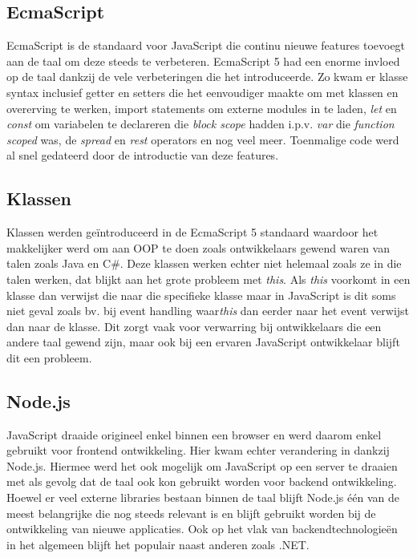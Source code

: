 \subsection{EcmaScript}
EcmaScript is de standaard voor JavaScript die continu nieuwe features toevoegt aan de taal om deze steeds te verbeteren. EcmaScript 5 had een enorme invloed op de taal dankzij de vele verbeteringen die het introduceerde. Zo kwam er klasse syntax inclusief getter en setters die het eenvoudiger maakte om met klassen en overerving te werken, import statements om externe modules in te laden, \textit{let} en \textit{const} om variabelen te declareren die \textit{block scope} hadden i.p.v. \textit{var} die \textit{function scoped} was, de \textit{spread} en \textit{rest} operators en nog veel meer. Toenmalige code werd al snel gedateerd door de introductie van deze features.

\subsection{Klassen}
Klassen werden geïntroduceerd in de EcmaScript 5 standaard waardoor het makkelijker werd om aan OOP te doen zoals ontwikkelaars gewend waren van talen zoals Java en C\#. Deze klassen werken echter niet helemaal zoals ze in die talen werken, dat blijkt aan het grote probleem met \textit{this}. Als \textit{this} voorkomt in een klasse dan verwijst die naar die specifieke klasse maar in JavaScript is dit soms niet geval zoals bv. bij event handling waar\textit{this} dan eerder naar het event verwijst dan naar de klasse. Dit zorgt vaak voor verwarring bij ontwikkelaars die een andere taal gewend zijn, maar ook bij een ervaren JavaScript ontwikkelaar blijft dit een probleem.

\subsection{Node.js}
JavaScript draaide origineel enkel binnen een browser en werd daarom enkel gebruikt voor frontend ontwikkeling. Hier kwam echter verandering in dankzij Node.js. Hiermee werd het ook mogelijk om JavaScript op een server te draaien met als gevolg dat de taal ook kon gebruikt worden voor backend ontwikkeling. Hoewel er veel externe libraries bestaan binnen de taal blijft Node.js één van de meest belangrijke die nog steeds relevant is en blijft gebruikt worden bij de ontwikkeling van nieuwe applicaties. Ook op het vlak van backendtechnologieën in het algemeen blijft het populair naast anderen zoals .NET.

